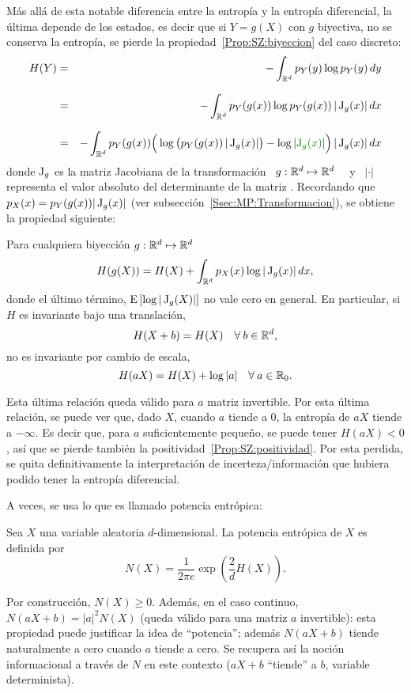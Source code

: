 M\'as  all\'a de esta  notable diferencia  entre la  entrop\'ia y  la entrop\'ia
diferencial, la \'ultima depende de los estados,  es decir que si $Y = g(X)$ con
$g$   biyectiva,   no   se   conserva   la  entrop\'ia,   \ie   se   pierde   la
propiedad~\ref{Prop:SZ:biyeccion} del caso discreto:
%
\begin{eqnarray*}
H(Y) & = & - \int_{\Rset^d} p_Y(y) \log p_Y(y) \, dy\\[2.5mm]
%
& = &  - \int_{\Rset^d} p_Y(g(x)) \log p_Y(g(x)) \, |\Jac_g(x)| \, dx\\[2.5mm]
%
& = & - \int_{\Rset^d} p_Y(g(x)) \Big( \log \big( p_Y(g(x)) \, |\Jac_g(x)| \big) -
\log |\modif{\Jac_g(x)}| \Big) \, |\Jac_g(x)| \, dx
\end{eqnarray*}
%
donde  $\operatorname{J}_g$ es  la matriz  Jacobiana de  la transformaci\'on  \  $g: \mathbb{R}^d
\mapsto \mathbb{R}^d$ \ \ y \ $|\cdot|$ representa el valor absoluto del determinante
de   la  matriz .   Recordando   que  $p_X(x)   =  p_Y(g(x))   |\operatorname{J}_g(x)|$  (ver
subsecci\'on~\ref{Ssec:MP:Transformacion}),
se obtiene la propiedad siguiente:
%
\begin{propiedadesC}\setcounter{enumi}{\value{PropBiyeccion}}
%
\item\label{Prop:SZ:biyeccionC}
Para  cualquiera biyecci\'on $g:  \mathbb{R}^d \mapsto  \mathbb{R}^d$
  \[
  H(g(X)) = H(X) + \int_{\mathbb{R}^d} p_X(x) \log |\operatorname{J}_g(x)| \, dx,
  \]
  donde el \'ultimo t\'ermino, $\operatorname{E}\left[  \log |\operatorname{J}_g(X)| \right]$ no vale cero
  en general.  En particular, si $H$ es invariante bajo una translaci\'on,
  \[
  H(X+b) = H(X) \quad \forall \: b \in \mathbb{R}^d,
  \]
  no  es invariante  por cambio  de escala,
  \[
  H(a X) = H(X) + \log |a| \quad \forall \: a \in \mathbb{R}_0.
  \]
\end{propiedadesC}
%
Esta \'ultima  relaci\'on queda v\'alido  para $a$ matriz invertible.   Por esta
\'ultima  relaci\'on, se puede  ver que,  dado $X$,  cuando $a$  tiende a  0, la
entrop\'ia de $a X$ tiende a  $-\infty$.  Es decir que, para $a$ suficientemente
peque\~no,  se puede  tener  $H(a X)  < 0$,  as\'i  que se  pierde tambi\'en  la
positividad~\ref{Prop:SZ:positividad}.     Por    esta    perdida,   se    quita
definitivamente  la  interpretaci\'on  de  incerteza/informaci\'on  que  hubiera
podido tener la entrop\'ia diferencial.

A veces, se usa lo que es llamado potencia entr\'opica:
%
\begin{definicion}
\label{Def:SZ:PotenciaEntropica}
%
  Sea $X$ una variable aleatoria $d$-dimensional. La potencia entr\'opica de $X$
  es definida por
  \[
  N(X) = \frac{1}{2 \pi e} \exp\left( \frac2d H(X) \right).
  \]
\end{definicion}
%
\noindent Por construcci\'on, $N(X) \ge 0$.  Adem\'as, en el caso continuo, $N(a
X+b)  =  |a|^2 N(X)$  (queda  v\'alido para  una  matriz  $a$ invertible):  esta
propiedad puede justificar  la idea de ``potencia''; adem\'as  $N(a X+b)$ tiende
naturalmente a  cero cuando $a$  tiende a cero.   Se recupera as\'i  la noci\'on
informacional a trav\'es  de $N$ en este  contexto ($a X + b$  ``tiende'' a $b$,
variable determinista).

